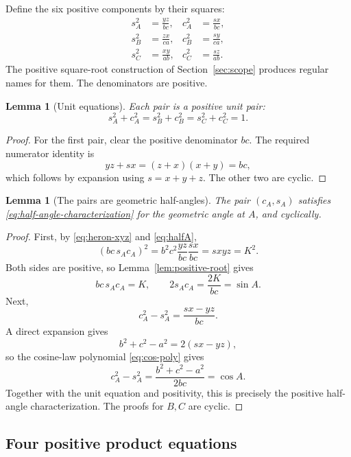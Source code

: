 \documentclass[11pt,letterpaper]{article}
\newtheorem{lemma}[theorem]{Lemma}
\theoremstyle{definition}
\theoremstyle{remark}
\begin{document}
Define the six positive components by their squares:
\begin{align}
 s_A^2&=\frac{yz}{bc}, & c_A^2&=\frac{sx}{bc},
 \tag{3.6a}\label{eq:halfA}\\
 s_B^2&=\frac{zx}{ca}, & c_B^2&=\frac{sy}{ca},
 \tag{3.6b}\label{eq:halfB}\\
 s_C^2&=\frac{xy}{ab}, & c_C^2&=\frac{sz}{ab}.
 \tag{3.6c}\label{eq:halfC}
\end{align}
The positive square-root construction of Section~\ref{sec:scope} produces
regular names for them.  The denominators are positive.

\begin{lemma}[Unit equations]
\label{lem:unit-equations}
Each pair is a positive unit pair:
\[
 s_A^2+c_A^2=s_B^2+c_B^2=s_C^2+c_C^2=1.
\]
\end{lemma}

\begin{proof}
For the first pair, clear the positive denominator \(bc\).  The required
numerator identity is
\[
 yz+sx=(z+x)(x+y)=bc,
\]
which follows by expansion using \(s=x+y+z\).  The other two are cyclic.
\end{proof}

\begin{lemma}[The pairs are geometric half-angles]
\label{lem:geometric-halfangles}
The pair \((c_A,s_A)\) satisfies \eqref{eq:half-angle-characterization} for the
geometric angle at \(A\), and cyclically.
\end{lemma}

\begin{proof}
First, by \eqref{eq:heron-xyz} and \eqref{eq:halfA},
\[
 (bc\,s_Ac_A)^2
 =b^2c^2\frac{yz}{bc}\frac{sx}{bc}
 =sxyz=K^2.
\]
Both sides are positive, so Lemma~\ref{lem:positive-root} gives
\[
 bc\,s_Ac_A=K,
 \qquad 2s_Ac_A=\frac{2K}{bc}=\sin A.
 \tag{3.7}\label{eq:half-sine}
\]
Next,
\[
 c_A^2-s_A^2=\frac{sx-yz}{bc}.
\]
A direct expansion gives
\[
 b^2+c^2-a^2=2(sx-yz),
\]
so the cosine-law polynomial \eqref{eq:cos-poly} gives
\[
 c_A^2-s_A^2=\frac{b^2+c^2-a^2}{2bc}=\cos A.
\]
Together with the unit equation and positivity, this is precisely the positive
half-angle characterization.  The proofs for \(B,C\) are cyclic.
\end{proof}

\subsection{Four positive product equations}
\end{document}
